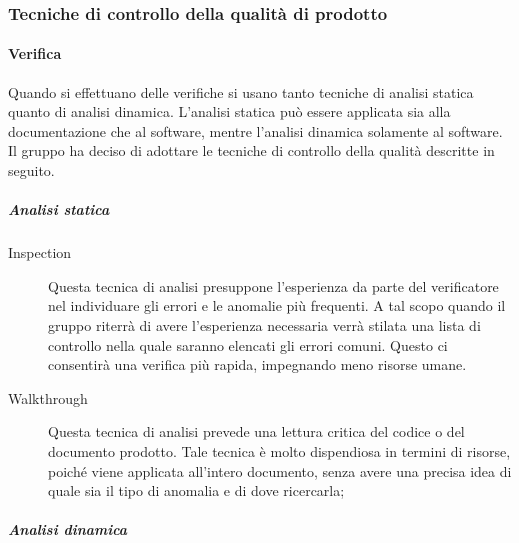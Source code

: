 \documentclass[../PianoDiQualifica.tex]{subfiles}
\begin{document}
			\subsubsection{Tecniche di controllo della qualità di prodotto}
				\paragraph{Verifica}
				 Quando si effettuano delle verifiche si usano tanto tecniche di analisi statica quanto di analisi dinamica. L'analisi statica può essere applicata sia alla documentazione che al software, mentre l'analisi dinamica solamente al software. Il gruppo ha deciso di adottare le tecniche di controllo della qualità descritte in seguito.
				 \subparagraph{Analisi statica}
					\begin{description}
						\item[Inspection] Questa tecnica di analisi presuppone l'esperienza da parte del verificatore nel individuare gli errori e le anomalie più frequenti. A tal scopo quando il gruppo riterrà di avere l'esperienza necessaria verrà stilata una lista di controllo nella quale saranno elencati gli errori comuni. Questo ci consentirà una verifica più rapida, impegnando meno risorse umane.
						\item[Walkthrough] Questa tecnica di analisi prevede una lettura critica del codice o del documento prodotto. Tale tecnica è molto dispendiosa in termini di risorse, poiché viene applicata all'intero documento, senza avere una precisa idea di quale sia il tipo di anomalia e di dove ricercarla;
					\end{description}
					\subparagraph{Analisi dinamica}
\end{document}
